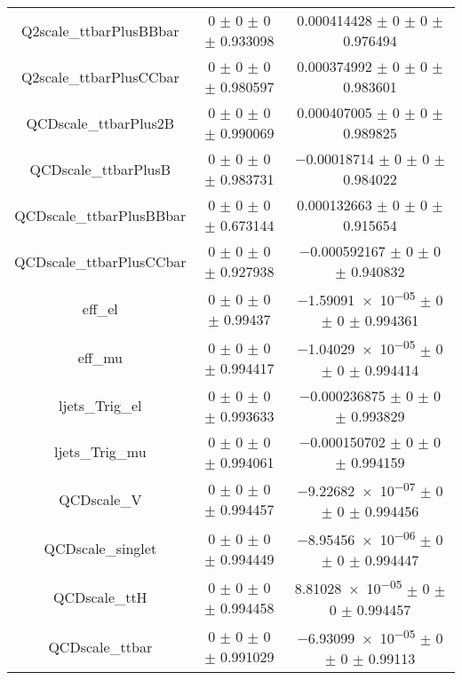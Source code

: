 \begin{table}
\begin{tabular}{ccc}
Q2scale\_ttbarPlusBBbar & \num{0} $\pm$ \num{0} $\pm$ \num{0} $\pm$ \num{0.933098} & \num{0.000414428} $\pm$ \num{0} $\pm$ \num{0} $\pm$ \num{0.976494}\\
Q2scale\_ttbarPlusCCbar & \num{0} $\pm$ \num{0} $\pm$ \num{0} $\pm$ \num{0.980597} & \num{0.000374992} $\pm$ \num{0} $\pm$ \num{0} $\pm$ \num{0.983601}\\
QCDscale\_ttbarPlus2B & \num{0} $\pm$ \num{0} $\pm$ \num{0} $\pm$ \num{0.990069} & \num{0.000407005} $\pm$ \num{0} $\pm$ \num{0} $\pm$ \num{0.989825}\\
QCDscale\_ttbarPlusB & \num{0} $\pm$ \num{0} $\pm$ \num{0} $\pm$ \num{0.983731} & \num{-0.00018714} $\pm$ \num{0} $\pm$ \num{0} $\pm$ \num{0.984022}\\
QCDscale\_ttbarPlusBBbar & \num{0} $\pm$ \num{0} $\pm$ \num{0} $\pm$ \num{0.673144} & \num{0.000132663} $\pm$ \num{0} $\pm$ \num{0} $\pm$ \num{0.915654}\\
QCDscale\_ttbarPlusCCbar & \num{0} $\pm$ \num{0} $\pm$ \num{0} $\pm$ \num{0.927938} & \num{-0.000592167} $\pm$ \num{0} $\pm$ \num{0} $\pm$ \num{0.940832}\\
eff\_el & \num{0} $\pm$ \num{0} $\pm$ \num{0} $\pm$ \num{0.99437} & \num{-1.59091e-05} $\pm$ \num{0} $\pm$ \num{0} $\pm$ \num{0.994361}\\
eff\_mu & \num{0} $\pm$ \num{0} $\pm$ \num{0} $\pm$ \num{0.994417} & \num{-1.04029e-05} $\pm$ \num{0} $\pm$ \num{0} $\pm$ \num{0.994414}\\
ljets\_Trig\_el & \num{0} $\pm$ \num{0} $\pm$ \num{0} $\pm$ \num{0.993633} & \num{-0.000236875} $\pm$ \num{0} $\pm$ \num{0} $\pm$ \num{0.993829}\\
ljets\_Trig\_mu & \num{0} $\pm$ \num{0} $\pm$ \num{0} $\pm$ \num{0.994061} & \num{-0.000150702} $\pm$ \num{0} $\pm$ \num{0} $\pm$ \num{0.994159}\\
QCDscale\_V & \num{0} $\pm$ \num{0} $\pm$ \num{0} $\pm$ \num{0.994457} & \num{-9.22682e-07} $\pm$ \num{0} $\pm$ \num{0} $\pm$ \num{0.994456}\\
QCDscale\_singlet & \num{0} $\pm$ \num{0} $\pm$ \num{0} $\pm$ \num{0.994449} & \num{-8.95456e-06} $\pm$ \num{0} $\pm$ \num{0} $\pm$ \num{0.994447}\\
QCDscale\_ttH & \num{0} $\pm$ \num{0} $\pm$ \num{0} $\pm$ \num{0.994458} & \num{8.81028e-05} $\pm$ \num{0} $\pm$ \num{0} $\pm$ \num{0.994457}\\
QCDscale\_ttbar & \num{0} $\pm$ \num{0} $\pm$ \num{0} $\pm$ \num{0.991029} & \num{-6.93099e-05} $\pm$ \num{0} $\pm$ \num{0} $\pm$ \num{0.99113}\\

\end{tabular}
\end{table}
